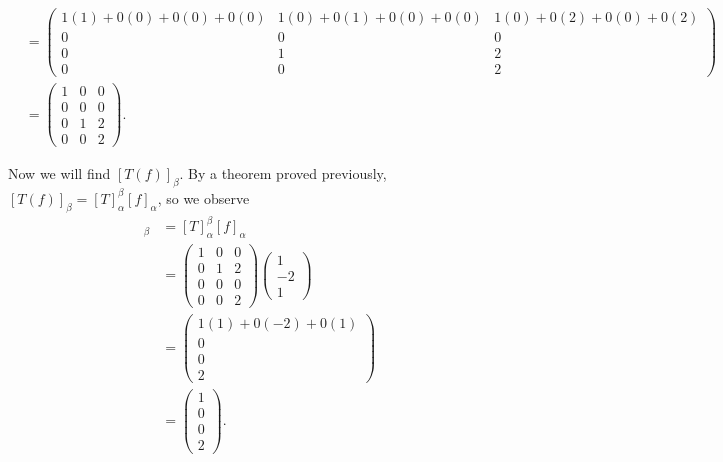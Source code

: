\documentclass[12pt,answers]{exam}
\begin{document}
\begin{solution}
\begin{enumerate}[label=\roman*)]
\begin{footnotesize}
\begin{align*}
    &=\begin{pmatrix} 1(1)+0(0)+0(0)+0(0) & 1(0)+0(1)+0(0)+0(0) & 1(0)+0(2)+0(0)+0(2) \\
                      0 & 0 & 0 \\
                      0 & 1 & 2 \\
                      0 & 0 & 2 \end{pmatrix} \\
    &=\begin{pmatrix} 1 & 0 & 0 \\
                      0 & 0 & 0 \\
                      0 & 1 & 2 \\
                      0 & 0 & 2 \end{pmatrix}.
\end{align*}
\end{footnotesize} 
Now we will find $[T(f)]_{\beta}$. By a theorem proved previously,  $[T(f)]_{\beta}=[T]^{\beta}_{\alpha}[f]_{\alpha}$, so we observe
\begin{align*}
    [T(f)]_{\beta}&=[T]^{\beta}_{\alpha}[f]_{\alpha} \\
    &=\begin{pmatrix} 1 & 0 & 0 \\
                      0 & 1 & 2 \\
                      0 & 0 & 0 \\
                      0 & 0 & 2 \end{pmatrix}
      \begin{pmatrix} 1 \\ -2 \\ 1 \end{pmatrix} \\
    &=\begin{pmatrix} 1(1)+0(-2)+0(1) \\ 0 \\ 0 \\ 2 \end{pmatrix}\\
    &=\begin{pmatrix} 1 \\ 0 \\ 0 \\ 2 \end{pmatrix}.
\end{align*}
\end{enumerate}
\end{solution}
\end{document}
